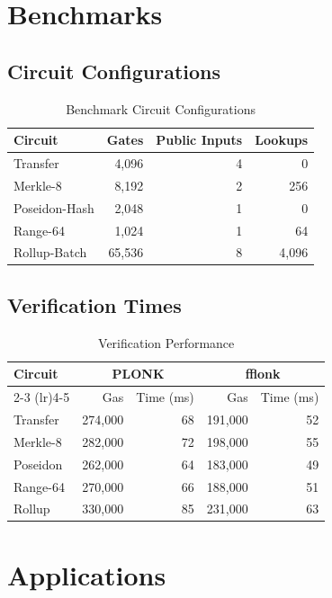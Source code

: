 \documentclass[11pt,a4paper]{article}
\theoremstyle{definition}
\begin{document}
\section{Benchmarks}

\subsection{Circuit Configurations}

\begin{table}[h]
\centering
\caption{Benchmark Circuit Configurations}
\begin{tabular}{lrrr}
\toprule
Circuit & Gates & Public Inputs & Lookups \\
\midrule
Transfer & 4,096 & 4 & 0 \\
Merkle-8 & 8,192 & 2 & 256 \\
Poseidon-Hash & 2,048 & 1 & 0 \\
Range-64 & 1,024 & 1 & 64 \\
Rollup-Batch & 65,536 & 8 & 4,096 \\
\bottomrule
\end{tabular}
\end{table}

\subsection{Verification Times}

\begin{table}[h]
\centering
\caption{Verification Performance}
\begin{tabular}{lrrrr}
\toprule
Circuit & \multicolumn{2}{c}{PLONK} & \multicolumn{2}{c}{fflonk} \\
\cmidrule(lr){2-3} \cmidrule(lr){4-5}
& Gas & Time (ms) & Gas & Time (ms) \\
\midrule
Transfer & 274,000 & 68 & 191,000 & 52 \\
Merkle-8 & 282,000 & 72 & 198,000 & 55 \\
Poseidon & 262,000 & 64 & 183,000 & 49 \\
Range-64 & 270,000 & 66 & 188,000 & 51 \\
Rollup & 330,000 & 85 & 231,000 & 63 \\
\bottomrule
\end{tabular}
\end{table}

\section{Applications}
\end{document}
